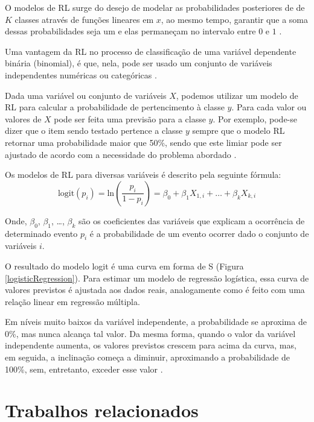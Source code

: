 O modelos de RL surge do desejo de modelar as probabilidades posteriores de de
\(K\) classes através de funções lineares em \(x\), ao mesmo tempo, garantir que
a soma dessas probabilidades seja um e elas permaneçam no intervalo entre \(0\)
e \(1\) \cite{james2013introduction}.


Uma vantagem da RL no processo de classificação de uma variável dependente
binária (binomial), é que, nela, pode ser usado um conjunto de variáveis
independentes numéricas ou categóricas \cite{kleinbaum2002analysis}.

Dada uma variável ou conjunto de variáveis \(X\), podemos utilizar um modelo de
RL para calcular a probabilidade de pertencimento à classe \(y\). Para cada
valor ou valores de \(X\) pode ser feita uma previsão para a classe \(y\). Por
exemplo, pode-se dizer que o item sendo testado pertence a classe \(y\) sempre
que o modelo RL retornar uma probabilidade maior que 50\%, sendo que este limiar
pode ser ajustado de acordo com a necessidade do problema abordado
\cite{james2013introduction}.

Os modelos de RL para diversas variáveis é descrito pela seguinte fórmula:
\[\text{logit}(p_i)
= \text{ln}\left(\frac{p_i}{1 - p_i}\right)
= \beta_0 + \beta_1 X_{1,i} + \ldots + \beta_k X_{k,i}\]

Onde, \(\beta_0\), \(\beta_1\), \ldots, \(\beta_k\) são os coeficientes das
variáveis que explicam a ocorrência de determinado evento \(p_i\) é a
probabilidade de um evento ocorrer dado o conjunto de variáveis \(i\).

O resultado do modelo logit é uma curva em forma de S (Figura
\ref{logisticRegression}).  Para estimar um modelo de regressão logística, essa
curva de valores previstos é ajustada aos dados reais, analogamente como é feito
com uma relação linear em regressão múltipla.

Em níveis muito baixos da variável independente, a probabilidade se aproxima de
0\%, mas nunca alcança tal valor. Da mesma forma, quando o valor da variável
independente aumenta, os valores previstos crescem para acima da curva, mas, em
seguida, a inclinação começa a diminuir, aproximando a probabilidade de 100\%,
sem, entretanto, exceder esse valor \cite{hair2009analise}.

\section{Trabalhos relacionados}

